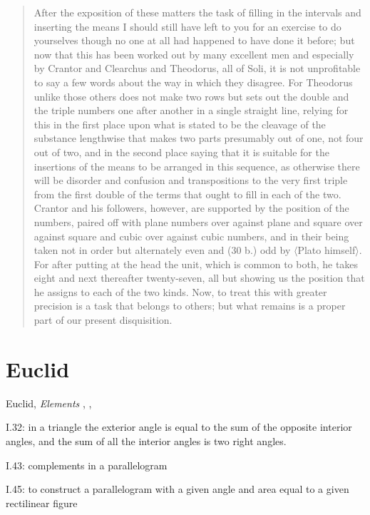\documentclass{amsart}
\theoremstyle{definition}
\begin{document}
\begin{quote}
After the exposition of these matters the task of filling in the intervals and inserting the means I should still have left to you for an exercise to do yourselves though no one at all had
happened to have done it before; but now that this has been worked out by many excellent men and especially by Crantor and Clearchus and Theodorus, all of Soli, it is not 
unprofitable to say a few words about the way in which they disagree. For Theodorus unlike those others does not make two rows but sets out the double and the triple numbers one 
after another in a single straight line, relying for this in the first place
upon what is stated to be the cleavage of the substance lengthwise that makes two parts presumably out of one, not four out of two, and in the second place saying that it is suitable
for the insertions of the means to be arranged in this sequence, as otherwise there will be disorder and confusion and transpositions to the very first triple from the first double of the
terms that ought to fill in each of the two. Crantor and his followers, however, are supported by the position of the numbers, paired off with plane numbers over against plane and
square over against square and cubic over against cubic numbers, and
in their being taken not in order but alternately even and (30 b.) odd by {$\langle$}Plato himself{$\rangle$}. For after
putting at the head the unit, which is common to both, he takes eight and next thereafter twenty-seven, all but showing us the position that he assigns to each of the two kinds.
Now, to treat this with greater precision is a task that belongs to others; but what remains is a proper part of our present disquisition.
\end{quote}








\section{Euclid}
Euclid, {\em Elements} \cite{euclidI}, \cite{euclidII}, \cite{euclidIII}

I.32: in a triangle the exterior angle is equal to the sum of the opposite interior angles, and the sum of all the interior angles is two right angles.

I.43: complements in a parallelogram

I.45: to construct a parallelogram with a given angle and area equal to a given rectilinear figure
\end{document}

